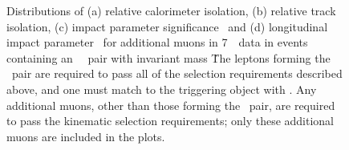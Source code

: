 \begin{figure}[h]
\centering
    \caption[ Distributions of relative track and calorimeter isolation, \dzerosig\
    and \zzero\ for additional muons in events containing a dilepton pair with mass
    \sstooos\ in 7~\tev\ data.]
    {Distributions of (a) relative calorimeter isolation,
    (b) relative track isolation, (c) impact parameter significance \dzerosig\ and
    (d) longitudinal impact parameter \zzero\ for additional muons  in 7~\tev\ data
    in events containing an \ossf\ \dilepton\ pair with invariant mass \sstooos\.
    The leptons forming the \dilepton\ pair are required to pass all of the
    selection requirements described above, and one must match to the triggering
    object with \ptgt{25}. Any additional muons, other than those forming the
    \dilepton\ pair, are required to pass the kinematic selection requirements; only
    these additional muons are included in the plots.}
\label{fig:objsel-mu}
\end{figure}
